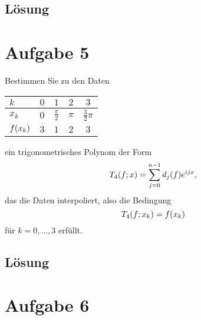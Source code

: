 \documentclass{exercise}
\begin{document}
    \subsection*{Lösung}


    \section*{Aufgabe 5}

    \begin{problem}
        Bestimmen Sie zu den Daten
        \begin{center}
            \begin{tabular}{lcccc}
                \toprule
                \(k\) & \(0\) & \(1\) & \(2\) & \(3\)\\
                \midrule
                \(x_k\) & \(0\) & \(\frac{\pi}{2}\) & \(\pi\) & \(\frac{3}{2}\pi\)\\
                \(f\parentheses*{x_k}\) & \(3\) & \(1\) & \(2\) & \(3\)\\
            \end{tabular}
        \end{center}
        ein trigonometrisches Polynom der Form
        \[
            T_4\parentheses*{f; x} = \sum_{j = 0}^{n - 1}d_j\parentheses*{f}e^{ijx},
        \]
        das die Daten interpoliert, also die Bedingung
        \[
            T_4\parentheses*{f; x_k} = f\parentheses*{x_k}
        \]
        für \(k = 0, \ldots, 3\) erfüllt.
    \end{problem}

    \subsection*{Lösung}


    \section*{Aufgabe 6}
\end{document}
